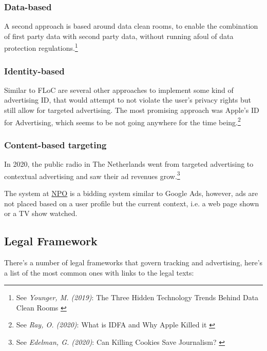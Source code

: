 \subsubsection{Data-based}

A second approach is based around data clean rooms, to enable the combination of first party data with second party data, without running afoul of data protection regulations.\footnote{See \textit{Younger, M. (2019)}: The Three Hidden Technology Trends Behind Data Clean Rooms \cite{cleanRoom}}

\subsubsection{Identity-based}

Similar to FLoC are several other approaches to implement some kind of advertising ID, that would attempt to not violate the user's privacy rights but still allow for targeted advertising. The most promising approach was Apple's ID for Advertising, which seems to be not going anywhere for the time being.\footnote{See \textit{Ray, O. (2020)}: What is IDFA and Why Apple Killed it \cite{cleanRoom}}

\subsubsection{Content-based targeting}

In 2020, the public radio in The Netherlands went from targeted advertising to contextual advertising and saw their ad revenues grow.\footnote{See \textit{Edelman, G. (2020)}: Can Killing Cookies Save Journalism? \cite{killingCookies}} 

The system at \href{https://over.npo.nl/}{NPO} is a bidding system similar to Google Ads, however, ads are not placed based on a user profile but the current context, i.e. a web page shown or a TV show watched.

\subsection{Legal Framework}

There's a number of legal frameworks that govern tracking and advertising, here's a list of the most common ones with links to the legal texts:

